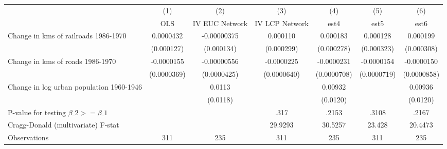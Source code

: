 {
\def\sym#1{\ifmmode^{#1}\else\(^{#1}\)\fi}
\begin{tabular}{l*{6}{c}}
\hline\hline
                &\multicolumn{1}{c}{(1)}&\multicolumn{1}{c}{(2)}&\multicolumn{1}{c}{(3)}&\multicolumn{1}{c}{(4)}&\multicolumn{1}{c}{(5)}&\multicolumn{1}{c}{(6)}\\
                &\multicolumn{1}{c}{OLS}&\multicolumn{1}{c}{IV EUC Network}&\multicolumn{1}{c}{IV LCP Network}&\multicolumn{1}{c}{est4}&\multicolumn{1}{c}{est5}&\multicolumn{1}{c}{est6}\\
\hline
Change in kms of railroads 1986-1970&0.0000432         &-0.00000375         & 0.000110         & 0.000183         & 0.000128         & 0.000199         \\
                &(0.000127)         &(0.000134)         &(0.000299)         &(0.000278)         &(0.000323)         &(0.000308)         \\
[1em]
Change in kms of roads 1986-1970&-0.0000155         &-0.00000556         &-0.0000225         &-0.0000231         &-0.0000154         &-0.0000150         \\
                &(0.0000369)         &(0.0000425)         &(0.0000640)         &(0.0000708)         &(0.0000719)         &(0.0000858)         \\
[1em]
Change in log urban population 1960-1946&                  &   0.0113         &                  &  0.00932         &                  &  0.00936         \\
                &                  & (0.0118)         &                  & (0.0120)         &                  & (0.0120)         \\
\hline
P-value for testing $\beta\_{2} >= \beta\_{1}$&                  &                  &     .317         &    .2153         &    .3108         &    .2167         \\
Cragg-Donald (multivariate) F-stat&                  &                  &  29.9293         &  30.5257         &   23.428         &  20.4473         \\
Observations    &      311         &      235         &      311         &      235         &      311         &      235         \\
\hline\hline
\end{tabular}
}
